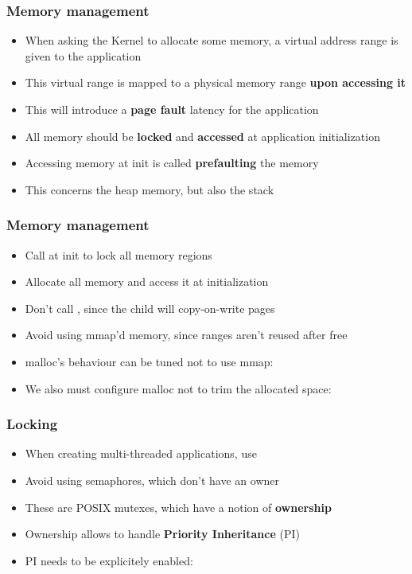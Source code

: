 
\begin{frame}
        \frametitle{Memory management}
        \begin{itemize}
                \item When asking the Kernel to allocate some memory, a virtual address range is given to the application
                \item This virtual range is mapped to a physical memory range \textbf{upon accessing it}
                \item This will introduce a \textbf{page fault} latency for the application
                \item All memory should be \textbf{locked} and \textbf{accessed} at application initialization
                \item Accessing memory at init is called \textbf{prefaulting} the memory
                \item This concerns the heap memory, but also the stack
        \end{itemize}
\end{frame}

\begin{frame}
        \frametitle{Memory management}
        \begin{itemize}
                \item Call  at init to lock all memory regions
                \item Allocate all memory and access it at initialization
                \item Don't call , since the child will copy-on-write pages
                \item Avoid using mmap'd memory, since ranges aren't reused after free
                \item malloc's behaviour can be tuned not to use mmap: 
                \item We also must configure malloc not to trim the allocated space: 
        \end{itemize}
\end{frame}

\begin{frame}
        \frametitle{Locking}
        \begin{itemize}
                \item When creating multi-threaded applications, use 
                \item Avoid using semaphores, which don't have an owner
                \item These are POSIX mutexes, which have a notion of \textbf{ownership}
                \item Ownership allows to handle \textbf{Priority Inheritance} (PI)
                \item PI needs to be explicitely enabled: 
        \end{itemize}
\end{frame}

